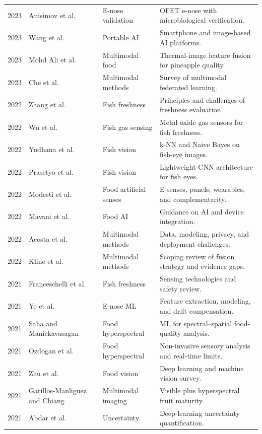 \documentclass[11pt]{article}
\begin{document}
\begin{longtable}{P{0.06\textwidth}P{0.31\textwidth}P{0.16\textwidth}P{0.37\textwidth}}
2023 & Anisimov et al. \citep{Anisimov2023food} & E-nose validation & OFET e-nose with microbiological verification.\\
2023 & Wang et al. \citep{Wang2023smartphone} & Portable AI & Smartphone and image-based AI platforms.\\
2023 & Mohd Ali et al. \citep{MohdAli2023utilisation} & Multimodal food & Thermal-image feature fusion for pineapple quality.\\
2023 & Che et al. \citep{Che2023multimodal} & Multimodal methods & Survey of multimodal federated learning.\\
2022 & Zhang et al. \citep{Zhang2022emerging} & Fish freshness & Principles and challenges of freshness evaluation.\\
2022 & Wu et al. \citep{Wu2023metal} & Fish gas sensing & Metal-oxide gas sensors for fish freshness.\\
2022 & Yudhana et al. \citep{Yudhana2022fish} & Fish vision & k-NN and Naive Bayes on fish-eye images.\\
2022 & Prasetyo et al. \citep{Prasetyo2022combining} & Fish vision & Lightweight CNN architecture for fish eyes.\\
2022 & Modesti et al. \citep{Modesti2022senses} & Food artificial senses & E-senses, panels, wearables, and complementarity.\\
2022 & Mavani et al. \citep{Mavani2022application} & Food AI & Guidance on AI and device integration.\\
2022 & Acosta et al. \citep{Acosta2022multimodal} & Multimodal methods & Data, modeling, privacy, and deployment challenges.\\
2022 & Kline et al. \citep{Kline2022multimodal} & Multimodal methods & Scoping review of fusion strategy and evidence gaps.\\
2021 & Franceschelli et al. \citep{Franceschelli2021sensing} & Fish freshness & Sensing technologies and safety review.\\
2021 & Ye et al. \citep{Ye2021recent} & E-nose ML & Feature extraction, modeling, and drift compensation.\\
2021 & Saha and Manickavasagan \citep{Saha2021machine} & Food hyperspectral & ML for spectral--spatial food-quality analysis.\\
2021 & Ozdogan et al. \citep{Ozdogan2021rapid} & Food hyperspectral & Non-invasive sensory analysis and real-time limits.\\
2021 & Zhu et al. \citep{Zhu2021deep} & Food vision & Deep learning and machine vision survey.\\
2021 & Garillos-Manliguez and Chiang \citep{GarillosManliguez2021multimodal} & Multimodal imaging & Visible plus hyperspectral fruit maturity.\\
2021 & Abdar et al. \citep{Abdar2021review} & Uncertainty & Deep-learning uncertainty quantification.\\
\end{longtable}
\end{document}
